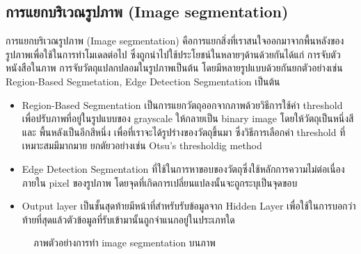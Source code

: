 \documentclass[12pt,oneside,openright,a4paper]{cpe-thai-project}
\begin{document}
\subsection{การแยกบริเวณรูปภาพ (Image segmentation)}
การแยกบริเวณรูปภาพ (Image segmentation) คือการแยกสิ่งที่เราสนใจออกมาจากพื้นหลังของรูปภาพเพื่อใช้ในการทำโมเดลต่อไป ซึ่งถูกนำไปใช้ประโยชน์ในหลายๆด้านด้วยกันได้แก่ 
การจับตัวหนังสือในภาพ การจับวัตถุแปลกปลอมในรูปภาพเป็นต้น โดยมีหลายรูปแบบด้วยกันยกตัวอย่างเช่น Region-Based Segmetation, Edge Detection Segmentation เป็นต้น
\begin{itemize}
  \item Region-Based Segmentation เป็นการแยกวัตถุออกจากภาพด้วยวิธีการใช้ค่า threshold เพื่อปรับภาพที่อยู่ในรูปแบบของ grayscale ให้กลายเป็น binary image โดยให้วัตถุเป็นหนึ่งสี และ พื้นหลังเป็นอีกสีหนึ่ง เพื่อที่เราจะได้รูปร่างของวัตถุขึ้นมา ซึ่งวิธีการเลือกค่า threshold ที่เหมาะสมมีมากมาย ยกตัยวอย่างเช่น Otsu’s thresholdig method

  \item Edge Detection Segmentation ที่ใช้ในการหาขอบของวัตถุซึ่งใช้หลักการความไม่ต่อเนื่องภายใน pixel ของรูปภาพ โดยจุดที่เกิดการเปลี่ยนแปลงนั้นจะถูกระบุเป็นจุดขอบ 
  \item Output layer เป็นชั้นสุดท้ายมีหน้าที่สำหรับรับข้อมูลจาก Hidden Layer เพื่อใช้ในการบอกว่าท้ายที่สุดแล้วตัวข้อมูลที่รับเข้ามานั้นถูกจำแนกอยู่ในประเภทใด
\end{itemize}
\begin{figure}[!ht]\centering
  \setlength{\fboxrule}{0.2mm} %
  \setlength{\fboxsep}{1cm}
  \caption{ภาพตัวอย่างการทำ image segmentation บนภาพ}\label{fig:imagesegment}
\end{figure}
\end{document}
